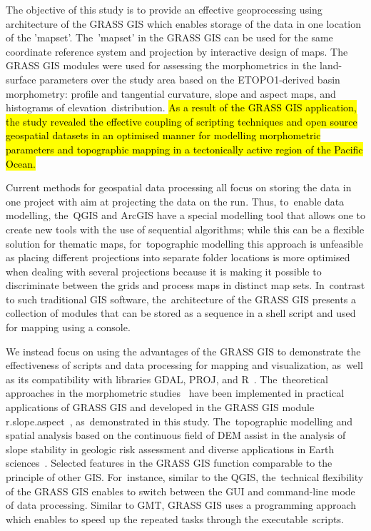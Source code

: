 \documentclass[technologies,article,accept,pdftex,moreauthors]{Definitions/mdpi}
\begin{document}
{The objective of this study is to provide an effective geoprocessing using architecture of the GRASS GIS which enables storage of the data in one location of the 'mapset'. The~'mapset' in the GRASS GIS can be used for the same coordinate reference system and projection by interactive design of maps. }The GRASS GIS modules were used for assessing the morphometrics in the land-surface parameters over the study area based on the ETOPO1-derived basin morphometry: profile and tangential curvature, slope and aspect maps, and histograms of elevation~distribution. \hl{As a result of the GRASS GIS application, the study revealed the effective coupling of scripting techniques and open source geospatial datasets in an optimised manner for modelling morphometric parameters and topographic mapping in a tectonically active region of the Pacific Ocean.}

{Current methods for geospatial data processing all focus on storing the data in one project with aim at projecting the data on the run. Thus, to~enable data modelling, the~QGIS and ArcGIS have a special modelling tool that allows one to create new tools with the use of sequential algorithms; while this can be a flexible solution for thematic maps, for~topographic modelling this approach is unfeasible as placing different projections into separate folder locations is more optimised when dealing with several projections because it is making it possible to discriminate between the grids and process maps in distinct map sets. In~contrast to such} traditional GIS software, the~architecture of the GRASS GIS presents a collection of modules that can be stored as a sequence in a shell script and used for mapping {using a console}. 

We {instead focus on using the} advantages of the GRASS GIS to demonstrate the effectiveness of scripts {and data processing }for mapping and visualization, as~well as its compatibility with libraries{ }GDAL, PROJ, and R~\cite{Bivand2000,Bivand1999,app122412554,Grohmann}. The~theoretical approaches in {the }morphometric studies~\cite{Chapman} have been implemented in practical applications of GRASS GIS and developed in {the }GRASS {GIS} module r.slope.aspect~\cite{Hofierka2009}, as~demonstrated in this study. The~topographic modelling and spatial analysis based on the continuous field of DEM assist in {the }analysis of slope stability in geologic risk assessment and diverse applications in Earth sciences~\cite{HofierkaSuri,Mitas1999,Mitasovaetal1996}. {Selected features in the GRASS GIS function comparable to the principle of other GIS. For~instance, similar to the QGIS, the~}technical flexibility of {the }GRASS GIS enables to switch between the GUI and command-line mode of data processing. Similar to GMT, GRASS GIS uses a programming approach which enables to speed up the repeated tasks through the executable~scripts. 
\end{document}
